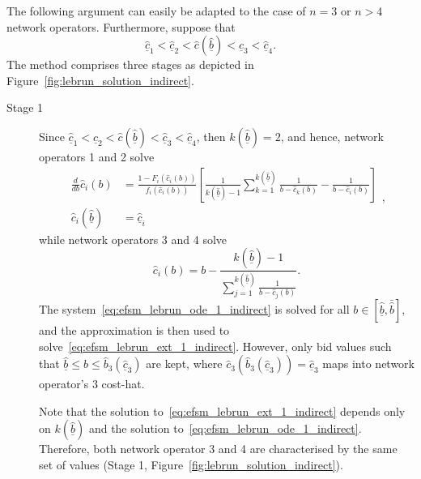  The following argument can easily be adapted to the case of $n=3$ or $n>4$ network operators. Furthermore, suppose that
\begin{equation}
  \underline{\hat{c}}_1 < \underline{\hat{c}}_2 < \hat{c}(\underline{\hat{b}}) < \underline{\hat{c}}_3 < \underline{\hat{c}}_4.
\end{equation}
The method comprises three stages as depicted in Figure~\ref{fig:lebrun_solution_indirect}.

\begin{description}
\item[Stage 1] Since $\underline{\hat{c}}_1 < \underline{\hat{c}}_2 < \hat{c}(\underline{\hat{b}}) < \underline{\hat{c}}_3 < \underline{\hat{c}}_4$, then $k(\underline{\hat{b}}) = 2$, and hence, network operators 1 and 2 solve
\begin{equation}
  \label{eq:efsm_lebrun_ode_1_indirect}
  \begin{array}{ll}
    \displaystyle\frac{d}{db}\hat{c}_i(b) &= \displaystyle\frac{1 - F_i(\hat{c}_i(b))}{f_i(\hat{c}_i(b))}\left[ \frac{1}{k(\underline{\hat{b}})-1}\sum_{k=1}^{k(\underline{\hat{b}})}\frac{1}{b - \hat{c}_k(b)} - \frac{1}{b - \hat{c}_i(b)} \right] \\[2ex]
    \hat{c}_i(\underline{\hat{b}}) &= \underline{\hat{c}}_i
  \end{array},
\end{equation}
while network operators 3 and 4 solve
\begin{equation}
  \label{eq:efsm_lebrun_ext_1_indirect}
  \hat{c}_i(b) = b - \frac{k(\underline{\hat{b}}) - 1}{\sum_{j=1}^{k(\underline{\hat{b}})} \frac{1}{b-\hat{c}_j(b)}}.
\end{equation}
The system~\eqref{eq:efsm_lebrun_ode_1_indirect} is solved for all $b\in[\underline{\hat{b}},\bar{\hat{b}}]$, and the approximation is then used to solve~\eqref{eq:efsm_lebrun_ext_1_indirect}. However, only bid values such that $\underline{\hat{b}} \leq b\leq \hat{b}_3(\underline{\hat{c}}_3)$ are kept, where $\hat{c}_3(\hat{b}_3(\underline{\hat{c}}_3)) = \underline{\hat{c}}_3$ maps into network operator's 3 cost-hat.

Note that the solution to~\eqref{eq:efsm_lebrun_ext_1_indirect} depends only on $k(\underline{\hat{b}})$ and the solution to~\eqref{eq:efsm_lebrun_ode_1_indirect}. Therefore, both network operator 3 and 4 are characterised by the same set of values (Stage 1, Figure~\ref{fig:lebrun_solution_indirect}).


\end{description}
